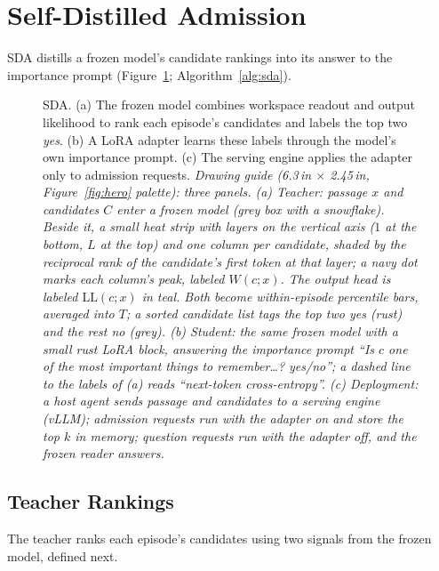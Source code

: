\section{Self-Distilled Admission}
\label{sec:method}

SDA distills a frozen model's candidate rankings into its answer to the
importance prompt (Figure~\ref{fig:sda}; Algorithm~\ref{alg:sda}).

\begin{figure}[t]
\centering
\figtodo{6.2cm}
\caption{SDA. (a) The frozen model combines workspace
readout and output likelihood to rank each episode's candidates and
labels the top two \emph{yes}. (b) A LoRA adapter learns these labels
through the model's own importance prompt. (c) The serving engine applies
the adapter only to admission requests.
\textit{Drawing guide (6.3\,in $\times$ 2.45\,in, Figure~\ref{fig:hero} palette): three panels.
(a) Teacher: passage $x$ and candidates $C$ enter a frozen model (grey box with a snowflake). Beside it,
a small heat strip with layers on the vertical axis ($1$ at the bottom, $L$ at the top) and one column per
candidate, shaded by the reciprocal rank of the candidate's first token at that layer; a navy dot marks
each column's peak, labeled $W(c;x)$. The output head is labeled $\mathrm{LL}(c;x)$ in teal. Both
become within-episode percentile bars, averaged into $T$; a sorted candidate list tags the top two
\emph{yes} (rust) and the rest \emph{no} (grey). (b) Student: the same frozen model with a small rust
LoRA block, answering the importance prompt ``Is $c$ one of the most important things to remember\ldots?
yes/no''; a dashed line to the labels of (a) reads ``next-token cross-entropy''. (c) Deployment: a host
agent sends passage and candidates to a serving engine (vLLM); admission requests run with the adapter
on and store the top $k$ in memory; question requests run with the adapter off, and the frozen reader
answers.}}
\label{fig:sda}
\end{figure}

\subsection{Teacher Rankings}
\label{sec:teacher}

The teacher ranks each episode's candidates using two signals from the
frozen model, defined next.

